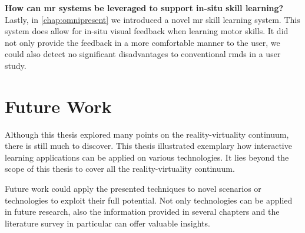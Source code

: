 \textbf{How can \acrlong{mr} systems be leveraged to support in-situ skill learning?}\\
Lastly, in \autoref{chap:omnipresent} we introduced a novel \acrshort{mr} skill learning system. This system does allow for in-situ visual feedback when learning motor skills. It did not only provide the feedback in a more comfortable manner to the user, we could also detect no significant disadvantages to conventional \acrshort{rmd}s in a user study.


\section{Future Work}
\label{sec:conclusion:future}

Although this thesis explored many points on the reality-virtuality continuum, there is still much to discover. This thesis illustrated exemplary how interactive learning applications can be applied on various technologies. It lies beyond the scope of this thesis to cover all the reality-virtuality continuum.

Future work could apply the presented techniques to novel scenarios or technologies to exploit their full potential. Not only technologies can be applied in future research, also the information provided in several chapters and the literature survey in particular can offer valuable insights.
